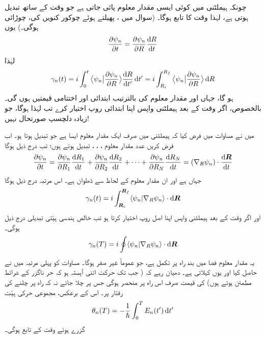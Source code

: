  چونکہ  ہیملٹنی میں کوئی ایسی مقدار معلوم  پائی  جاتی  ہے جو وقت کے ساتھ تبدیل ہوتی  ہے، لہٰذا  وقت  کا تابع ہوگا۔   (سوال    میں  ،  پھیلتے ہوئے چوکور کنویں کی،  چوڑائی  ہوگی۔)  یوں
\begin{align}\label{مساوات_حر_ایک_مقدار_معلوم}
\frac{\partial \psi_n}{\partial t} = \frac{\partial \psi_n}{\partial R} \frac{\dif R}{\dif t}
\end{align}
لہٰذا 
\begin{align}\label{مساوات_حر_ہندسی_ہیّت_فرق}
\gamma_n (t) = i \int_0^t \big\langle \psi_n \big| \frac{\partial \psi_n}{\partial R} \big\rangle \frac{\dif R}{\dif t'} \dif t' = i \int_{R_i}^{R_f} \big\langle \psi_n \big | \frac{\partial \psi_n}{\partial R}\big \rangle \dif R 
\end{align}
ہو گا، جہاں  اور  مقدار معلوم  کی بالترتیب ابتدائی اور اختتامی قیمتیں ہوں گی۔ بالخصوص،  اگر وقت   کے  بعد ہیملٹنی واپس اپنا  ابتدائی روپ اختیار کرے تب  لہٰذا  ہوگا،  جو زیادہ دلچسپ  صورتحال نہیں!

 میں نے مساوات    میں فرض کیا کہ ہیملٹنی میں صرف ایک مقدار معلوم ایسا ہے جو تبدیل ہوتا ہو۔ اب  فرض کریں  عدد مقدار معلوم ،  ، ،  تبدیل ہوتے ہوں؛  تب درج ذیل ہوگا 
\begin{align}
\frac{\partial \psi_n}{\partial t} = \frac{\partial \psi_n}{\partial R_1} \frac{\dif R_1}{\dif t} + \frac{\partial \psi_n}{\partial R_2} \frac{\dif R_2}{\dif t} + \cdots + \frac{\partial \psi_n}{\partial R_N} \frac{\dif R_N}{\dif t} = (\nabla_R \psi_n) \cdot \frac{\dif \kvec{R}}{\dif t}
\end{align} 
جہاں  ہے اور  ان مقدار معلوم کے لحاظ سے ڈھلوان ہے۔  اس مرتبہ درج ذیل ہوگا 
\begin{align}
\gamma_n (t) = i \int_{\kvec{R}_i}^{\kvec{R}_f} \langle \psi_n | \nabla_R \psi_n \rangle \cdot \dif \kvec{R}
\end{align}
اور اگر وقت  کے بعد ہیملٹنی واپس اپنا  اصل روپ اختیار کرتا ہو تب خالص  ہندسی ہیّتی تبدیلی درج ذیل ہوگی۔
\begin{align}\label{مساوات_حر_غیر_صفر_لکیری_تکمل}
\gamma_n (T) = i \oint \langle \psi_n | \nabla_R \psi_n \rangle \cdot \dif \kvec{R}
\end{align}
یہ مقدار معلوم   فضا میں  بند راہ پر    تکمل ہے، جو عموماً غیر صفر ہوگا۔ مساوات    کو پہلی مرتبہ    میں     نے حاصل کیا اور یوں    کہلاتی ہے۔ دھیان رہے  کہ ( جب تک  حرکت  اتنی آہستہ ہو کہ  حر ناگزر کے شرائط مطمئن ہوتے ہوں)   کی قیمت صرف اس راہ پر منحصر ہوگی جس پر چلا جائے نہ کہ راہ پر چلنے کی رفتار پر۔  اس کے برعکس،  مجموعی حرکی ہیّت 
\begin{align*}
\theta_n (T) = - \frac{1}{\hslash} \int_0^T E_n (t') \dif t'
\end{align*}
گزرے ہوئے وقت کے  تابع ہوگی۔

